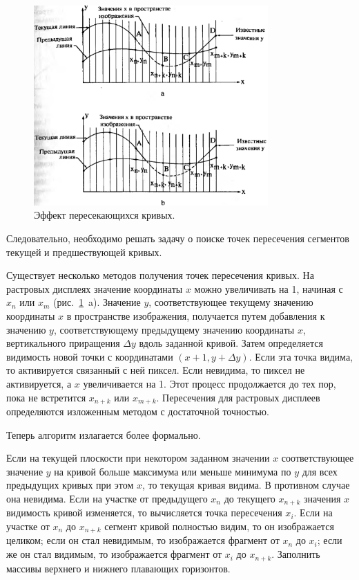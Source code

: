 \begin{figure}[H]
    \centering
    \includegraphics[width=0.8\textwidth]{img/floating_horizon_6.png}
    \caption{Эффект пересекающихся кривых.}
    \label{fig:floating_horizon_6}
\end{figure}

Следовательно, необходимо решать задачу о поиске точек пересечения сегментов текущей и предшествующей кривых.

Существует несколько методов получения точек пересечения кривых. На растровых дисплеях значение координаты \( x \) можно увеличивать на 1, начиная с \( x_n \) или \( x_m \) (рис.~\ref{fig:floating_horizon_6}~a). Значение \( y \), соответствующее текущему значению координаты \( x \) в пространстве изображения, получается путем добавления к значению \( y \), соответствующему предыдущему значению координаты \( x \), вертикального приращения \( \Delta y \) вдоль заданной кривой. Затем определяется видимость новой точки с координатами \( (x+1, y + \Delta y) \). Если эта точка видима, то активируется связанный с ней пиксел. Если невидима, то пиксел не активируется, а \( x \) увеличивается на 1. Этот процесс продолжается до тех пор, пока не встретится \( x_{n+k} \) или \( x_{m+k} \). Пересечения для растровых дисплеев определяются изложенным методом с достаточной точностью.

Теперь алгоритм излагается более формально.

Если на текущей плоскости при некотором заданном значении \( x \) соответствующее значение \( y \) на кривой больше максимума или меньше минимума по \( y \) для всех предыдущих кривых при этом \( x \), то текущая кривая видима. В противном случае она невидима. Если на участке от предыдущего \( x_n \) до текущего \( x_{n+k} \) значения \( x \) видимость кривой изменяется, то вычисляется точка пересечения \( x_i \). Если на участке от \( x_n \) до \( x_{n+k} \) сегмент кривой полностью видим, то он изображается целиком; если он стал невидимым, то изображается фрагмент от \( x_n \) до \( x_i \); если же он стал видимым, то изображается фрагмент от \( x_i \) до \( x_{n+k} \). Заполнить массивы верхнего и нижнего плавающих горизонтов.

